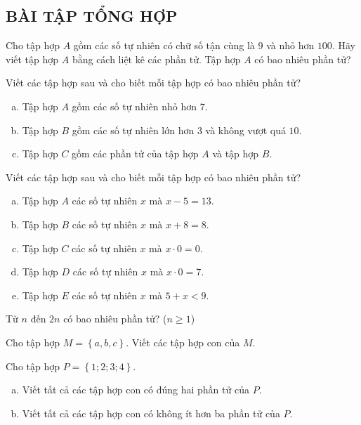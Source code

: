 \begin{bt}
\subsection{BÀI TẬP TỔNG HỢP}
\end{bt}   \begin{bt}
Cho tập hợp $A$ gồm các số tự nhiên có chữ số tận cùng là $9$ và nhỏ hơn $100$. Hãy viết tập hợp $A$ bằng cách liệt kê các phần tử. Tập hợp $A$ có bao nhiêu phần tử?
\end{bt}   \begin{bt}
Viết các tập hợp sau và cho biết mỗi tập hợp có bao nhiêu phần tử?
\begin{enumerate}[a)]
\item Tập hợp $A$ gồm các số tự nhiên nhỏ hơn $7$.
\item Tập hợp $B$ gồm các số tự nhiên lớn hơn $3$ và không vượt quá $10$.
\item Tập hợp $C$ gồm các phần tử của tập hợp $A$ và tập hợp $B$.
\end{enumerate}
\end{bt}   \begin{bt}
Viết  các tập hợp sau và cho biết mỗi tập hợp có bao nhiêu phần tử?
\begin{enumerate}[a)]
\item	Tập hợp $A$ các số tự nhiên $x$ mà $x - 5 = 13$.
\item	Tập hợp $B$ các số tự nhiên $x$ mà  $x + 8 = 8$.
\item	Tập hợp $C$ các số tự nhiên $x$ mà  $x\cdot 0 = 0$.
\item	Tập hợp $D$ các số tự nhiên $x$ mà  $x\cdot 0 = 7$.
\item	Tập hợp $E$ các số tự nhiên  $x$ mà $5 + x < 9$.
\end{enumerate}
\end{bt}   \begin{bt} 
Từ $n$ đến $2n$ có bao nhiêu phần tử? ($n\geq 1$)
\end{bt}   \begin{bt}
Cho tập hợp $M =\left\{a, b, c\right\}$. Viết các tập hợp con của $M$.
\end{bt}   \begin{bt}
Cho tập hợp $P = \left\{1; 2; 3; 4\right\}$.
\begin{enumerate}[a)]
\item Viết tất cả các tập hợp con có đúng hai phần tử của $P$.
\item Viết tất cả các tập hợp con có không ít hơn ba phần tử của $P$.

\end{enumerate}
\end{bt}
